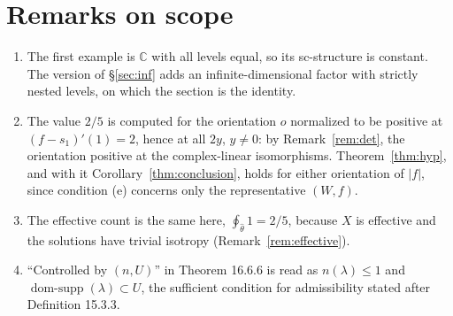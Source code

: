 \documentclass[11pt,a4paper]{article}
\theoremstyle{plain}
\theoremstyle{definition}
\theoremstyle{remark}
\newcommand{\C}{\mathbb{C}}
\newcommand{\abs}[1]{\lvert #1\rvert}
\newcommand{\domsupp}{\operatorname{dom-supp}}
\begin{document}
\section{Remarks on scope}

\begin{enumerate}[label=(\arabic*)]
\item The first example is $\C$ with all levels equal, so its sc-structure is constant. The version of
  \S\ref{sec:inf} adds an infinite-dimensional factor with strictly nested levels, on which the section is
  the identity.
\item The value $2/5$ is computed for the orientation $o$ normalized to be positive at $(f-s_1)'(1)=2$,
  hence at all $2y$, $y\neq0$: by Remark~\ref{rem:det}, the orientation positive at the complex-linear
  isomorphisms. Theorem~\ref{thm:hyp}, and with it Corollary~\ref{thm:conclusion}, holds for either
  orientation of $\abs f$, since condition (e) concerns only the representative $(W,f)$.
\item The effective count is the same here, $\oint_{\hat\theta}1=2/5$, because $X$ is effective and the
  solutions have trivial isotropy (Remark~\ref{rem:effective}).
\item ``Controlled by $(n,U)$'' in Theorem 16.6.6 is read as $n(\lambda)\le1$ and
  $\domsupp(\lambda)\subset U$, the sufficient condition for admissibility stated after
  Definition 15.3.3.
\end{enumerate}
\end{document}

